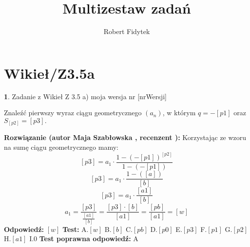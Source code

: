 \documentclass[12pt, a4paper]{article}
\title{Multizestaw zadań}
\author{Robert Fidytek}
\date{}
\theoremstyle{definition} %
\newtheorem{zad}{}
\newcommand{\kategoria}[1]{\section{#1}} %
\newcommand{\zadStart}[1]{\begin{zad}#1\newline} %
\newcommand{\zadStop}{\end{zad}}   %
\newcommand{\rozwStart}[2]{\noindent \textbf{Rozwiązanie (autor #1 , recenzent #2): }\newline} %
\newcommand{\rozwStop}{\newline}                                            %
\newcommand{\odpStart}{\noindent \textbf{Odpowiedź:}\newline}    %
\newcommand{\odpStop}{\newline}                                             %
\newcommand{\testStart}{\noindent \textbf{Test:}\newline} %
\newcommand{\testStop}{\newline} %
\newcommand{\kluczStart}{\noindent \textbf{Test poprawna odpowiedź:}\newline} %
\newcommand{\kluczStop}{\newline} %
\begin{document}
\maketitle


\kategoria{Wikieł/Z3.5a}
\zadStart{Zadanie z Wikieł Z 3.5 a)  moja wersja nr [nrWersji]}


Znaleźć pierwszy wyraz ciągu geometrycznego $(a_{n})$, w którym $q=-[p1]$ oraz $S_{[p2]}=[p3].$
\zadStop
\rozwStart{Maja Szabłowska}{}
Korzystając ze wzoru na sumę ciągu geometrycznego mamy:
$$ [p3]=a_{1}\cdot \frac{1-(-[p1])^{[p2]}}{1-(-[p1])}$$
$$ [p3]=a_{1}\cdot \frac{1-([a])}{[b]}$$
$$ [p3]=a_{1}\cdot \frac{[a1]}{[b]}$$
$$ a_{1}=\frac{[p3]}{\frac{[a1]}{[b]}}=\frac{[p3]\cdot[b]}{[a1]}=\frac{[pb]}{[a1]}=[w]$$
\rozwStop
\odpStart
$[w]$
\odpStop
\testStart
A.$[w]$
B.$[b]$
C.$[pb]$
D.$[p0]$
E.$[p3]$
F.$[p1]$
G.$[p2]$
H.$[a1]$
I.$0$
\testStop
\kluczStart
A
\kluczStop
\end{document}
